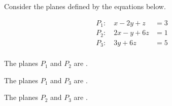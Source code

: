\documentclass{ximera}
\author{Jim Talamo}
\begin{document}
\begin{exercise}

Consider the planes defined by the equations below.

\[
\begin{array}{lr}
P_1:  \quad x-2y+z &=3 \\
P_2:  \quad  2x-y+6z &= 1 \\
P_3:  \quad  3y+6z &=5 \\
\end{array}
\]

The planes $P_1$ and $P_2$ are .

The planes $P_1$ and $P_3$ are .

The planes $P_2$ and $P_3$ are .

\end{exercise}
\end{document}
